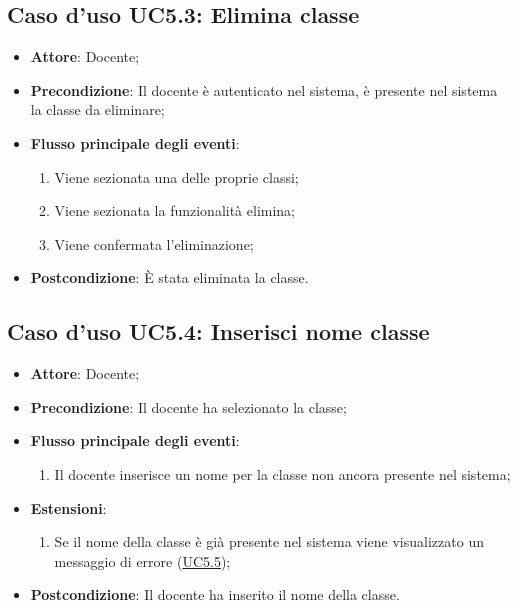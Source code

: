 \documentclass[12pt,a4paper]{article}
\begin{document}
\subsection{Caso d'uso UC5.3: Elimina classe}

\begin{itemize}

\item \textbf{Attore}: Docente; 
\item \textbf{Precondizione}: Il docente è autenticato nel sistema, è presente nel sistema la classe da eliminare;

\item \textbf{Flusso principale degli eventi}:
\begin{enumerate}
	\item Viene sezionata una delle proprie classi;
	\item Viene sezionata la funzionalità elimina;
	\item Viene confermata l'eliminazione;
	
\end{enumerate}
\item \textbf{Postcondizione}: È stata eliminata la classe.
\end{itemize}
\hypertarget{UC5.4}{}
\subsection{Caso d'uso UC5.4: Inserisci nome classe}

\begin{itemize}

\item \textbf{Attore}: Docente; 
\item \textbf{Precondizione}: Il docente ha selezionato la classe;

\item \textbf{Flusso principale degli eventi}:
\begin{enumerate}
	\item Il docente inserisce un nome per la classe non ancora presente nel sistema;
	
\end{enumerate}
\item \textbf{Estensioni}:
\begin{enumerate}
	\item Se il nome della classe è già presente nel sistema viene visualizzato un messaggio di errore (\hyperlink{UC5.5}{UC5.5});
	
\end{enumerate}
\item \textbf{Postcondizione}: Il docente ha inserito il nome della classe.
\end{itemize}
\hypertarget{UC5.5}{}
\end{document}
